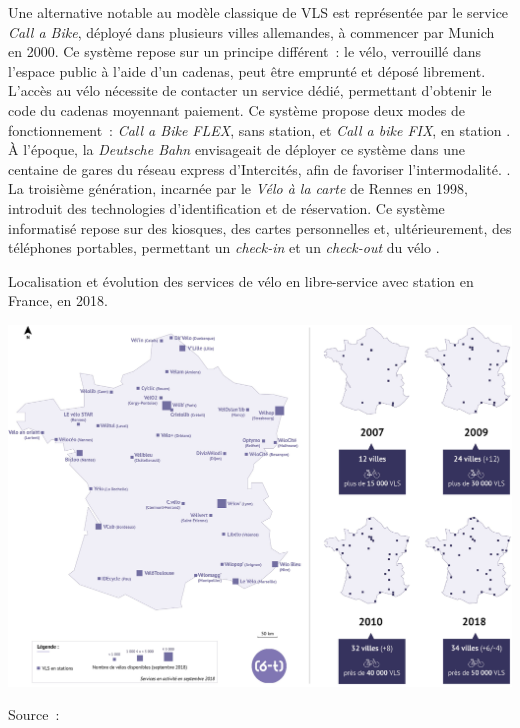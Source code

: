 \begin{refsegment}
{    Une alternative notable au modèle classique de \acrshort{VLS} est représentée par le service \textsl{Call a Bike}, déployé dans plusieurs villes allemandes, à commencer par Munich en 2000. Ce système repose sur un principe différent~: le vélo, verrouillé dans l’espace public à l’aide d’un cadenas, peut être emprunté et déposé librement. L’accès au vélo nécessite de contacter un service dédié, permettant d’obtenir le code du cadenas moyennant paiement. Ce système propose deux modes de fonctionnement~: \textsl{Call a Bike FLEX}, sans station, et \textsl{Call a bike FIX}, en station \textcolor{blue}{\autocite[18]{6t-bureau_de_recherche_etude_2018}}. À l’époque, la \textsl{Deutsche Bahn} envisageait de déployer ce système dans une centaine de gares du réseau express d'Intercités, afin de favoriser l’intermodalité.
} \textcolor{blue}{\autocite[160]{shaheen_bikesharing_2010}}. La troisième génération, incarnée par le \textsl{Vélo à la carte} de Rennes en 1998, introduit des technologies d’identification et de réservation. Ce système informatisé repose sur des kiosques, des cartes personnelles et, ultérieurement, des téléphones portables, permettant un \textsl{check-in} et un \textsl{check-out} du vélo \textcolor{blue}{\autocite[8]{nlc_micromobility_2019}}.%

    \begin{carte}[h!]\vspace*{4pt}
        \caption{Localisation et évolution des services de vélo en libre-service avec station en France, en 2018.}
        \label{fig-chap1:carte-vls-france}
        \centerline{\includegraphics[width=1\columnwidth]{src/Figures/Chap-1/FR_Carte_VLS_France.jpg}}
        \vspace{5pt}
        \begin{flushright}\scriptsize{
        Source~: \textcolor{blue}{\textcite{6t-bureau_de_recherche_lechappee_2018}}
        }\end{flushright}
    \end{carte}


\end{refsegment}
